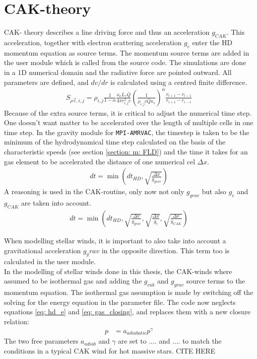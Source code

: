 \section{CAK-theory}
CAK- theory describes a line driving force and thus an acceleration $g_{CAK}$. This acceleration, together with electron scattering acceleration $g_e$ enter the  HD momentum equation as source terms. The momentum source terms are added in the user module which is called from the source code. The simulations are done in a 1D numerical domain and the radiative force are pointed outward. All parameters are defined, and $dv/dr$ is calculated using a centred finite difference. 
\begin{align}
S_{\rho \vec{v},i,j} = \rho_{i,j} \frac{1}{1-\alpha} \frac{\kappa_e L_* \bar{Q}}{4\pi r_{i,j}^2 c} \left( \frac{1}{\rho_{i,j} c \bar{Q} \kappa_e} \right)^\alpha \frac{v_{i+1} - v_{i-1}}{r_{i+1} - r_{i-1}}
\end{align}
Because of the extra source terms, it is critical to adjust the numerical time step. One doesn't want matter to be accelerated over the length of multiple cells in one time step. In the gravity module for \texttt{MPI-AMRVAC}, the timestep is taken to be the minimum of the hydrodynamical time step calculated on the basis of the characteristic speeds (see section \ref{section: m: FLD}) and the time it takes for an gas element to be accelerated the distance of one numerical cel $\Delta x$.
\begin{align}
dt = \min\left(dt_{HD},\sqrt{\frac{\Delta x}{g_{grav}}} \right)
\end{align}
A reasoning is used in the CAK-routine, only now not only $g_{grav}$ but also $g_e$ and $g_{CAK}$ are taken into account.
\begin{align}
dt = \min\left(dt_{HD},\sqrt{\frac{\Delta x}{g_{grav}}},\sqrt{\frac{\Delta x}{g_{e}}},\sqrt{\frac{\Delta x}{g_{CAK}}} \right)
\end{align}

When modelling stellar winds, it is important to also take into account a gravitational acceleration $g_grav$ in the opposite direction. This term too is calculated in the user module.\\
In the modelling of stellar winds done in this thesis, the CAK-winds where assumed to be isothermal gas and adding the $g_{cak}$ and $g_{grav}$ source terms to the momentum equation. The isothermal gas assumption is made by switching off the solving for the energy equation in the parameter file. The code now neglects equations \eqref{eq: hd_e} and \eqref{eq: gas_closing}, and replaces them with a new closure relation:
\begin{align}
 p &= a_{adiabatic} p^\gamma
\end{align}
The two free parameters $a_{adiab}$ and $\gamma$ are set to .... and .... to match the conditions in a typical CAK wind for hot massive stars. CITE HERE\\


